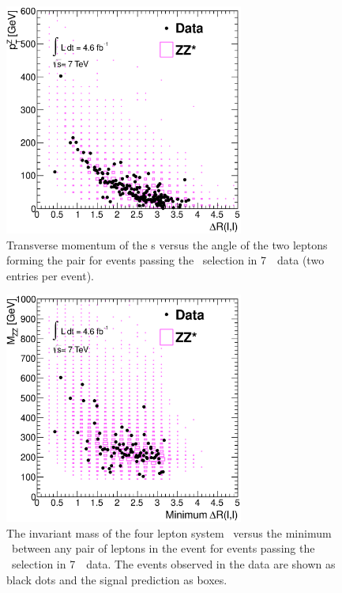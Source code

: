 {%
 \begin{figure}[htbp]
 \begin{center}
  \includegraphics[width=0.7\textwidth]{7TeV/h_dr_ptz}\hfill
  \caption[Transverse momentum of the \leppair s versus the angle of the two leptons
    forming the pair for events passing the \ZZs\ selection in 7~\tev\ data.]
    {\small Transverse momentum of the \leppair s versus the angle of the two leptons
    forming the pair for events passing the \ZZs\ selection in 7~\tev\ data (two
    entries per event).}
 \label{fig:zzdists-dr-ptz1-seven}
 \end{center}
 \end{figure}

 \begin{figure}[htbp]
 \begin{center}
  \includegraphics[width=0.7\textwidth]{7TeV/h_mindr_mzz}\hfill
  \caption[The invariant mass of the four lepton system \mZZ\ versus the
    minimum \deltaR\ between any pair of leptons in the event for events passing
    the \ZZs\ selection in 7~\tev\ data.]
    {\small The invariant mass of the four lepton system \mZZ\ versus the
    minimum \deltaR\ between any pair of leptons in the event for events passing
    the \ZZs\ selection in 7~\tev\ data.
    The events observed in the data are shown as black dots and the signal prediction as boxes.}
 \label{fig:zzdists-mindr-mzz-seven}
 \end{center}
 \end{figure}

}
